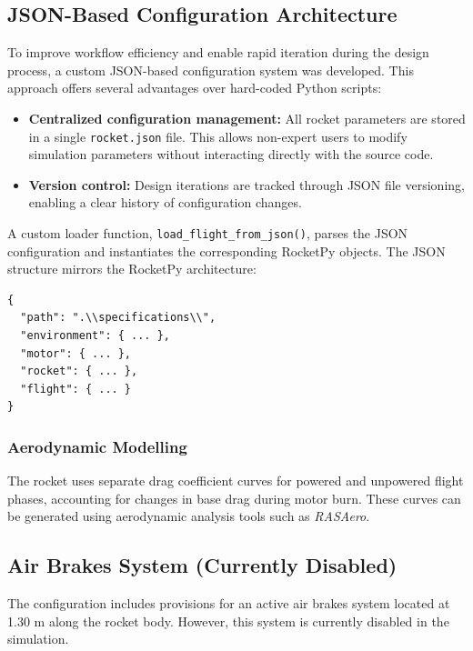 \subsection{JSON-Based Configuration Architecture}

To improve workflow efficiency and enable rapid iteration during the design process, a custom JSON-based configuration system was developed. This approach offers several advantages over hard-coded Python scripts:

\begin{itemize}
    \item \textbf{Centralized configuration management:}  
    All rocket parameters are stored in a single \texttt{rocket.json} file. This allows non-expert users to modify simulation parameters without interacting directly with the source code.

    \item \textbf{Version control:}  
    Design iterations are tracked through JSON file versioning, enabling a clear history of configuration changes.
\end{itemize}

A custom loader function, \texttt{load\_flight\_from\_json()}, parses the JSON configuration and instantiates the corresponding RocketPy objects. The JSON structure mirrors the RocketPy architecture:

\begin{verbatim}
{
  "path": ".\\specifications\\",
  "environment": { ... },
  "motor": { ... },
  "rocket": { ... },
  "flight": { ... }
}
\end{verbatim}

\subsubsection*{Aerodynamic Modelling}

The rocket uses separate drag coefficient curves for powered and unpowered flight phases, accounting for changes in base drag during motor burn. These curves can be generated using aerodynamic analysis tools such as \textit{RASAero}.

\subsection{Air Brakes System (Currently Disabled)}

The configuration includes provisions for an active air brakes system located at 1.30 m along the rocket body. However, this system is currently disabled in the simulation.

